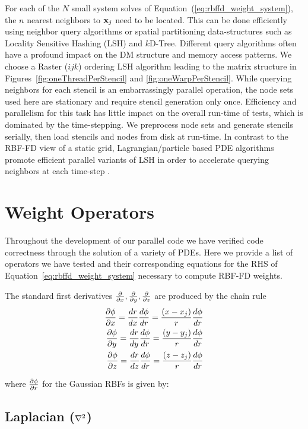\documentclass{report}
\begin{document}
{For each of the $N$ small system solves of Equation~(\ref{eq:rbffd_weight_system}), the $n$ nearest neighbors to $\mathbf{x}_j$ need to be located. This can be done efficiently using neighbor query algorithms or spatial partitioning data-structures such as Locality Sensitive Hashing (LSH) and $k$D-Tree. Different query algorithms often have a profound impact on the DM structure and memory access patterns. We choose a Raster ($ijk$) ordering LSH algorithm \cite{Bollig2011} leading to the matrix structure in Figures~\ref{fig:oneThreadPerStencil} and \ref{fig:oneWarpPerStencil}. While querying neighbors for each stencil is an embarrassingly parallel operation, the node sets used here are stationary and require stencil generation only once. Efficiency and parallelism for this task has little impact on the overall run-time of tests, which is dominated by the time-stepping. We preprocess node sets and generate stencils serially, then load stencils and nodes from disk at run-time. In contrast to the RBF-FD view of a static grid, Lagrangian/particle based PDE algorithms promote efficient parallel variants of LSH in order to accelerate querying neighbors at each time-step \cite{Pan2011, Goswami2010}. 


\section{Weight Operators}
Throughout the development of our parallel code we have verified code correctness through the solution of a variety of PDEs. Here we provide a list of operators we have tested and their corresponding equations for the RHS of Equation~\ref{eq:rbffd_weight_system} necessary to compute RBF-FD weights. 

The standard first derivatives $\frac{\partial }{\partial x}, \frac{\partial }{\partial y}, \frac{\partial }{\partial z}$ are produced by the chain rule
	\begin{align} 
	 \frac{\partial \phi}{\partial x} = \frac{d r}{d x} \frac{d \phi}{d r} = \frac{(x-x_{j})}{r} \frac{d \phi}{d r} \\
	 \frac{\partial \phi}{\partial y} = \frac{d r}{d y} \frac{d \phi}{d r} = \frac{(y-y_{j})}{r} \frac{d \phi}{d r} \\
	 \frac{\partial \phi}{\partial z} = \frac{d r}{d z} \frac{d \phi}{d r} = \frac{(z-z_{j})}{r} \frac{d \phi}{d r}
	\end{align}

where $\frac{\partial \phi}{\partial r}$ for the Gaussian RBFs is given by: 


\subsection{Laplacian ($\Laplacian$)}

}
\end{document}
